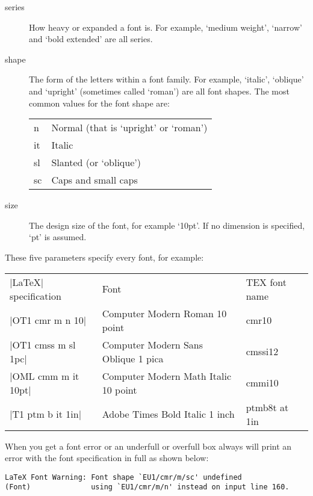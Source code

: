 \begin{description}
\item[series] How heavy or expanded a font is. For example, `medium weight', `narrow'
and `bold extended' are all series.

\item[shape] The form of the letters within a font family. For example, `italic',
`oblique' and `upright' (sometimes called `roman') are all font shapes. The most common values for the font shape are:

\begin{longtable}{ll}
n  &Normal (that is `upright' or `roman')\\
it &Italic\\
sl &Slanted (or `oblique')\\
sc &Caps and small caps\\
\end{longtable}

\item[size] The design size of the font, for example `10pt'. If no dimension is specified, `pt' is assumed.
\end{description}

These five parameters specify every \latex
font, for example:

\begin{longtable}{lll}
|LaTeX| specification &Font  &TEX font name\\
|OT1 cmr m n 10|      &Computer Modern Roman 10 point &cmr10\\
|OT1 cmss m sl 1pc|   &Computer Modern Sans Oblique 1 pica &cmssi12\\
|OML cmm m it 10pt|   &Computer Modern Math Italic 10 point &cmmi10\\
|T1 ptm b it 1in|  &Adobe Times Bold Italic 1 inch &ptmb8t at 1in\\
\end{longtable}

When you get a font error or an underfull or overfull box \tex always will print an error with the font specification in full as shown below:

\begin{verbatim}
LaTeX Font Warning: Font shape `EU1/cmr/m/sc' undefined
(Font)              using `EU1/cmr/m/n' instead on input line 160.
\end{verbatim}



